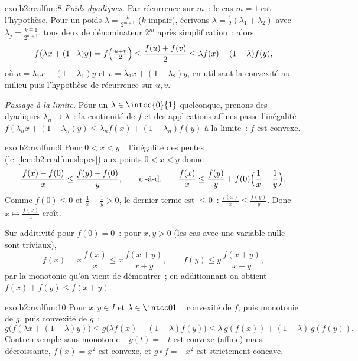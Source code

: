\begin{solution}{exo:b2:realfun:8}
\emph{Poids dyadiques.} Par récurrence sur $m$~: le cas $m = 1$ est
l'hypothèse. Pour un poids $\lambda = \frac{k}{2^{m+1}}$ ($k$
impair), écrivons $\lambda = \frac12(\lambda_1 + \lambda_2)$ avec
$\lambda_j = \frac{k \mp 1}{2^{m+1}}$, tous deux de dénominateur
$2^m$ après simplification~; alors
\[
f\bigl(\lambda x + (1{-}\lambda)y\bigr)
= f\Bigl(\tfrac{u + v}{2}\Bigr)
\leq \frac{f(u) + f(v)}{2}
\leq \lambda f(x) + (1 - \lambda) f(y),
\]
où $u = \lambda_1 x + (1 - \lambda_1)y$ et $v = \lambda_2 x +
(1-\lambda_2)y$, en utilisant la convexité au milieu puis
l'hypothèse de récurrence sur $u, v$.

\emph{Passage à la limite.} Pour un $\lambda \in \intcc{0}{1}$
quelconque, prenons des dyadiques $\lambda_n \to \lambda$~: la
continuité de $f$ et des applications affines passe l'inégalité
$f(\lambda_n x + (1-\lambda_n)y) \leq \lambda_n f(x) +
(1-\lambda_n)f(y)$ à la limite~: $f$ est convexe.
\end{solution}

\begin{solution}{exo:b2:realfun:9}
Pour $0 < x < y$~: l'inégalité des pentes
(le~\cref{lem:b2:realfun:slopes}) aux points $0 < x < y$ donne
\[
\frac{f(x) - f(0)}{x} \leq \frac{f(y) - f(0)}{y},
\qquad\text{c.-à-d.}\qquad
\frac{f(x)}{x} \leq \frac{f(y)}{y} +
f(0)\Bigl(\frac1x - \frac1y\Bigr).
\]
Comme $f(0) \leq 0$ et $\frac1x - \frac1y > 0$, le dernier terme est
$\leq 0$~: $\frac{f(x)}{x} \leq \frac{f(y)}{y}$. Donc $x \mapsto
\frac{f(x)}x$ croît.

Sur-additivité pour $f(0) = 0$~: pour $x, y > 0$ (les cas avec une
variable nulle sont triviaux),
\[
f(x) = x\,\frac{f(x)}{x} \leq x\,\frac{f(x+y)}{x+y},
\qquad
f(y) \leq y\,\frac{f(x+y)}{x+y},
\]
par la monotonie qu'on vient de démontrer~; en additionnant on
obtient $f(x) + f(y) \leq f(x+y)$.
\end{solution}

\begin{solution}{exo:b2:realfun:10}
Pour $x, y \in I$ et $\lambda \in \intcc01$~: convexité de $f$, puis
monotonie de $g$, puis convexité de $g$~:
\[
g\bigl(f(\lambda x + (1{-}\lambda)y)\bigr)
\leq g\bigl(\lambda f(x) + (1{-}\lambda)f(y)\bigr)
\leq \lambda\,g(f(x)) + (1{-}\lambda)\,g(f(y)).
\]
Contre-exemple sans monotonie~: $g(t) = -t$ est convexe (affine)
mais décroissante, $f(x) = x^2$ est convexe, et $g \circ f = -x^2$
est strictement concave.
\end{solution}

